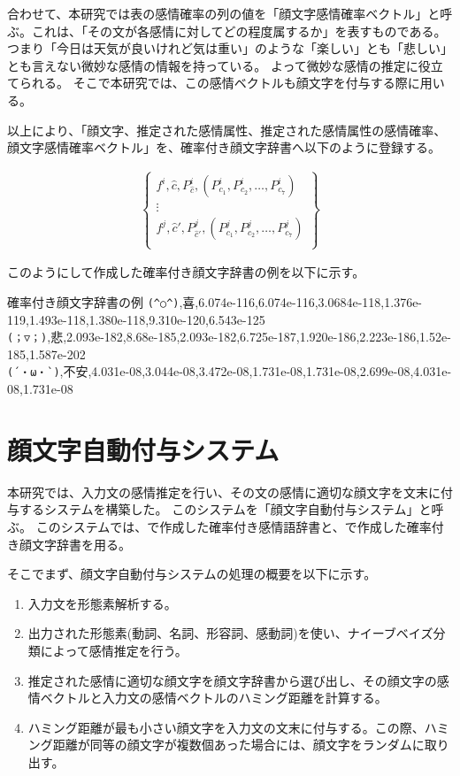 \documentclass[11pt,a4j]{jsarticle}
\begin{document}
合わせて、本研究では表の感情確率の列の値を「顔文字感情確率ベクトル」と呼ぶ。これは、「その文が各感情に対してどの程度属するか」を表すものである。
つまり「今日は天気が良いけれど気は重い」のような「楽しい」とも「悲しい」とも言えない微妙な感情の情報を持っている。
よって微妙な感情の推定に役立てられる。
そこで本研究では、この感情ベクトルも顔文字を付与する際に用いる。

以上により、「顔文字、推定された感情属性、推定された感情属性の感情確率、顔文字感情確率ベクトル」を、確率付き顔文字辞書へ以下のように登録する。

\begin{eqnarray*}
  \left\{
   \begin{array}{c}
     f^i, \hat{c}, P^i_{\hat{c}}, (P^i_{c_1}, P^i_{c_2}, \ldots, P^i_{c_7})\\
     \vdots \\
     f^j, \hat{c}', P^j_{\hat{c}'}, (P^j_{c_1}, P^j_{c_2}, \ldots, P^j_{c_7})\\
   \end{array}
  \right\}
\end{eqnarray*}

このようにして作成した確率付き顔文字辞書の例を以下に示す。

\begin{itembox}[l]{確率付き顔文字辞書の例}
\verb|(^○^)|,喜,6.074e-116,6.074e-116,3.0684e-118,1.376e-119,1.493e-118,1.380e-118,9.310e-120,6.543e-125\\
\verb|(；▽；)|,悲,2.093e-182,8.68e-185,2.093e-182,6.725e-187,1.920e-186,2.223e-186,1.52e-185,1.587e-202\\
\verb|(´・ω・`)|,不安,4.031e-08,3.044e-08,3.472e-08,1.731e-08,1.731e-08,2.699e-08,4.031e-08,1.731e-08\\
\end{itembox}

\section{顔文字自動付与システム}
本研究では、入力文の感情推定を行い、その文の感情に適切な顔文字を文末に付与するシステムを構築した。
このシステムを「顔文字自動付与システム」と呼ぶ。%
このシステムでは、で作成した確率付き感情語辞書と、で作成した確率付き顔文字辞書を用る。

そこでまず、顔文字自動付与システムの処理の概要を以下に示す。

\begin{enumerate}
  \item 入力文を形態素解析する。
  \item 出力された形態素(動詞、名詞、形容詞、感動詞)を使い、ナイーブベイズ分類によって感情推定を行う。
  \item 推定された感情に適切な顔文字を顔文字辞書から選び出し、その顔文字の感情ベクトルと入力文の感情ベクトルのハミング距離を計算する。
  \item ハミング距離が最も小さい顔文字を入力文の文末に付与する。この際、ハミング距離が同等の顔文字が複数個あった場合には、顔文字をランダムに取り出す。
\end{enumerate}
\end{document}

